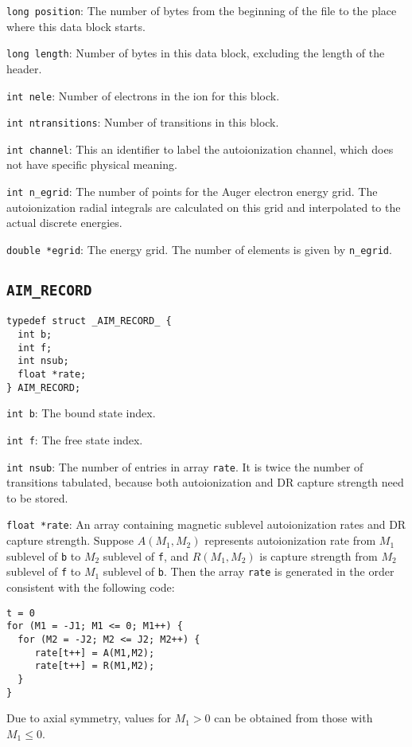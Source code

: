 \begin{dbdesc}
\item[\texttt{long position}:] The number of bytes from the beginning of the
file to the place where this data block starts.
\item[\texttt{long length}:] Number of bytes in this data block, excluding the
length of the header.
\item[\texttt{int nele}:] Number of electrons in the ion for this block.
\item[\texttt{int ntransitions}:] Number of transitions in this block.
\item[\texttt{int channel}:] This an identifier to label the autoionization
channel, which does not have specific physical meaning.
\item[\texttt{int n\_egrid}:] The number of points for the Auger electron
energy grid. The autoionization radial integrals are calculated on this grid
and interpolated to the actual discrete energies.
\item[\texttt{double *egrid}:] The energy grid. The number of elements is
given by \texttt{n\_egrid}.
\end{dbdesc}

\subsection{\texttt{AIM\_RECORD}}
\begin{verbatim}
typedef struct _AIM_RECORD_ {
  int b;
  int f;
  int nsub;
  float *rate;
} AIM_RECORD;
\end{verbatim}
\begin{dbdesc}
\item[\texttt{int b}:] The bound state index.
\item[\texttt{int f}:] The free state index.
\item[\texttt{int nsub}:] The number of entries in array \texttt{rate}. It is
twice the number of transitions tabulated, because both autoionization and DR
capture strength need to be stored. 
\item[\texttt{float *rate}:] An array containing magnetic sublevel
autoionization rates and DR capture strength. Suppose $A(M_1,M_2)$ represents
autoionization rate from $M_1$ sublevel of \texttt{b} to $M_2$ sublevel of
\texttt{f}, and $R(M_1,M_2)$ is capture strength from $M_2$ sublevel of
\texttt{f} to $M_1$ sublevel of \texttt{b}. Then the array \texttt{rate} is
generated in the order consistent with the following code:
\begin{verbatim}
t = 0
for (M1 = -J1; M1 <= 0; M1++) {
  for (M2 = -J2; M2 <= J2; M2++) {
     rate[t++] = A(M1,M2);
     rate[t++] = R(M1,M2);
  }
}
\end{verbatim}
Due to axial symmetry, values for $M_1 > 0$ can be obtained from those with
$M_1 \le 0$.
\end{dbdesc}

